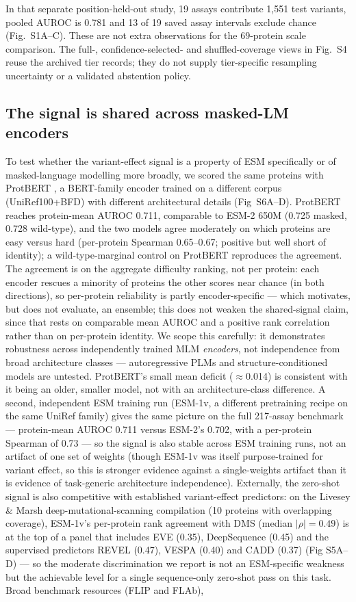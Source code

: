 \documentclass[12pt]{article}
\begin{document}
In that separate position-held-out study, 19 assays contribute 1,551 test
variants, pooled AUROC is 0.781 and 13 of 19 saved assay intervals exclude
chance (Fig.~S1A--C). These are not extra observations for the 69-protein
scale comparison. The full-, confidence-selected- and shuffled-coverage
views in Fig.~S4 reuse the archived tier records; they do not supply
tier-specific resampling uncertainty or a validated abstention policy.

\subsection{The signal is shared across masked-LM encoders}

To test whether the variant-effect signal is a property of ESM specifically or of masked-language modelling more broadly, we scored the same proteins with ProtBERT \citep{Elnaggar2021}, a BERT-family encoder trained on a different corpus (UniRef100+BFD) with different architectural details (Fig~S6A--D). ProtBERT reaches protein-mean AUROC 0.711, comparable to ESM-2 650M (0.725 masked, 0.728 wild-type), and the two models agree moderately on which proteins are easy versus hard (per-protein Spearman 0.65--0.67; positive but well short of identity); a wild-type-marginal control on ProtBERT reproduces the agreement. The agreement is on the aggregate difficulty ranking, not per protein: each encoder rescues a minority of proteins the other scores near chance (in both directions), so per-protein reliability is partly encoder-specific --- which motivates, but does not evaluate, an ensemble; this does not weaken the shared-signal claim, since that rests on comparable mean AUROC and a positive rank correlation rather than on per-protein identity. We scope this carefully: it demonstrates robustness across independently trained MLM \textit{encoders}, not independence from broad architecture classes --- autoregressive PLMs and structure-conditioned models are untested. ProtBERT's small mean deficit ($\approx$0.014) is consistent with it being an older, smaller model, not with an architecture-class difference. A second, independent ESM training run (ESM-1v, a different pretraining recipe on the same UniRef family) gives the same picture on the full 217-assay benchmark --- protein-mean AUROC 0.711 versus ESM-2's 0.702, with a per-protein Spearman of 0.73 --- so the signal is also stable across ESM training runs, not an artifact of one set of weights (though ESM-1v was itself purpose-trained for variant effect, so this is stronger evidence against a single-weights artifact than it is evidence of task-generic architecture independence). Externally, the zero-shot signal is also competitive with established variant-effect predictors: on the Livesey \& Marsh deep-mutational-scanning compilation (10 proteins with overlapping coverage), ESM-1v's per-protein rank agreement with DMS (median $|\rho| = 0.49$) is at the top of a panel that includes EVE (0.35), DeepSequence (0.45) and the supervised predictors REVEL (0.47), VESPA (0.40) and CADD (0.37) (Fig S5A--D) --- so the moderate discrimination we report is not an ESM-specific weakness but the achievable level for a single sequence-only zero-shot pass on this task. Broad benchmark resources (FLIP and FLAb), 
\end{document}
